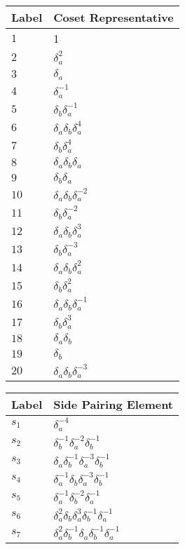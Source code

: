 \documentclass{article}
\begin{document}

\begin{center}
\begin{tabular}{ll}
\toprule
Label & Coset Representative\\
\midrule
$1$ & 1 \\
$2$ & $\delta_a^{2}$ \\
$3$ & $\delta_a^{}$ \\
$4$ & $\delta_a^{-1}$ \\
$5$ & $\delta_b^{}\delta_a^{-1}$ \\
$6$ & $\delta_a^{}\delta_b^{}\delta_a^{4}$ \\
$7$ & $\delta_b^{}\delta_a^{4}$ \\
$8$ & $\delta_a^{}\delta_b^{}\delta_a^{}$ \\
$9$ & $\delta_b^{}\delta_a^{}$ \\
$10$ & $\delta_a^{}\delta_b^{}\delta_a^{-2}$ \\
$11$ & $\delta_b^{}\delta_a^{-2}$ \\
$12$ & $\delta_a^{}\delta_b^{}\delta_a^{3}$ \\
$13$ & $\delta_b^{}\delta_a^{-3}$ \\
$14$ & $\delta_a^{}\delta_b^{}\delta_a^{2}$ \\
$15$ & $\delta_b^{}\delta_a^{2}$ \\
$16$ & $\delta_a^{}\delta_b^{}\delta_a^{-1}$ \\
$17$ & $\delta_b^{}\delta_a^{3}$ \\
$18$ & $\delta_a^{}\delta_b^{}$ \\
$19$ & $\delta_b^{}$ \\
$20$ & $\delta_a^{}\delta_b^{}\delta_a^{-3}$ \\
\bottomrule
\end{tabular}
\hfill
\begin{tabular}{ll}
\toprule
Label & Side Pairing Element\\
\midrule
$s_{1}$ & $\delta_a^{-4}$ \\
$s_{2}$ & $\delta_b^{-1}\delta_a^{-2}\delta_b^{-1}$ \\
$s_{3}$ & $\delta_a^{}\delta_b^{-1}\delta_a^{-3}\delta_b^{-1}$ \\
$s_{4}$ & $\delta_a^{-1}\delta_b^{}\delta_a^{-3}\delta_b^{-1}$ \\
$s_{5}$ & $\delta_a^{-1}\delta_b^{-2}\delta_a^{-1}$ \\
$s_{6}$ & $\delta_a^{2}\delta_b^{}\delta_a^{3}\delta_b^{-1}\delta_a^{-1}$ \\
$s_{7}$ & $\delta_a^{2}\delta_b^{-1}\delta_a^{}\delta_b^{-1}\delta_a^{-1}$ \\

\end{tabular}
\end{center}
\end{document}
